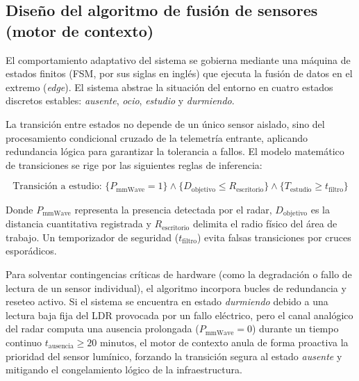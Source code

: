 \subsection{Diseño del algoritmo de fusión de sensores (motor de contexto)}
El comportamiento adaptativo del sistema se gobierna mediante una máquina de estados finitos (FSM, por sus siglas en inglés) que ejecuta la fusión de datos en el extremo (\textit{edge}). El sistema abstrae la situación del entorno en cuatro estados discretos estables: \textit{ausente}, \textit{ocio}, \textit{estudio} y \textit{durmiendo}.

La transición entre estados no depende de un único sensor aislado, sino del procesamiento condicional cruzado de la telemetría entrante, aplicando redundancia lógica para garantizar la tolerancia a fallos. El modelo matemático de transiciones se rige por las siguientes reglas de inferencia:

\begin{equation}
\text{Transición a estudio: } \{ P_{\text{mmWave}} = 1 \} \land \{ D_{\text{objetivo}} \le R_{\text{escritorio}} \} \land \{ T_{\text{estudio}} \ge t_{\text{filtro}} \}
\end{equation}

Donde $P_{\text{mmWave}}$ representa la presencia detectada por el radar, $D_{\text{objetivo}}$ es la distancia cuantitativa registrada y $R_{\text{escritorio}}$ delimita el radio físico del área de trabajo. Un temporizador de seguridad ($t_{\text{filtro}}$) evita falsas transiciones por cruces esporádicos.

Para solventar contingencias críticas de hardware (como la degradación o fallo de lectura de un sensor individual), el algoritmo incorpora bucles de redundancia y reseteo activo. Si el sistema se encuentra en estado \textit{durmiendo} debido a una lectura baja fija del LDR provocada por un fallo eléctrico, pero el canal analógico del radar computa una ausencia prolongada ($P_{\text{mmWave}} = 0$) durante un tiempo continuo $t_{\text{ausencia}} \ge 20 \text{ minutos}$, el motor de contexto anula de forma proactiva la prioridad del sensor lumínico, forzando la transición segura al estado \textit{ausente} y mitigando el congelamiento lógico de la infraestructura.

